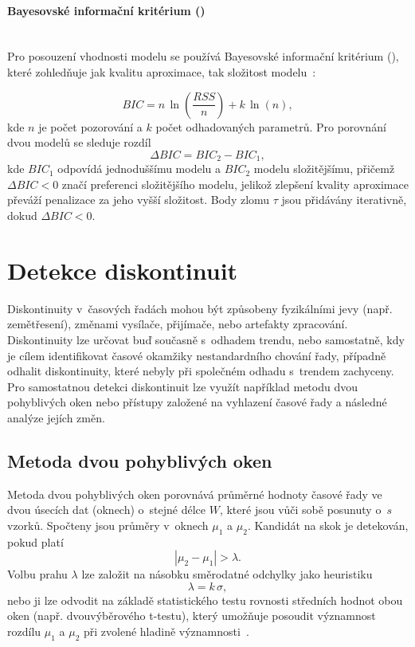 \paragraph{Bayesovské informační kritérium ()}\leavevmode\\
Pro posouzení vhodnosti modelu se používá Bayesovské informační kritérium (), které zohledňuje jak kvalitu aproximace, tak složitost modelu~\cite{kass_raftery_1995}:

\begin{equation}
BIC = n\,\ln\!\left(\frac{RSS}{n}\right) + k\,\ln(n),
\label{eq:bic}
\end{equation}
kde \(n\) je počet pozorování a \(k\) počet odhadovaných parametrů. Pro porovnání dvou modelů se sleduje rozdíl
\begin{equation}
\Delta BIC = BIC_{\mathrm{2}}-BIC_{\mathrm{1}},
\label{eq:delta_bic}
\end{equation}
kde \(BIC_1\) odpovídá jednoduššímu modelu a \(BIC_2\) modelu složitějšímu, přičemž \(\Delta BIC < 0\) značí preferenci složitějšího modelu, jelikož zlepšení kvality aproximace převáží penalizace za jeho vyšší složitost. Body zlomu \(\tau\) jsou přidávány iterativně, dokud \(\Delta BIC < 0\).

\section{Detekce diskontinuit}

Diskontinuity v~časových řadách mohou být způsobeny fyzikálními jevy (např. zemětřesení), změnami vysílače, přijímače, nebo artefakty zpracování. Diskontinuity lze určovat buď současně s~odhadem trendu, nebo samostatně, kdy je cílem identifikovat časové okamžiky nestandardního chování řady, případně odhalit diskontinuity, které nebyly při společném odhadu s~trendem zachyceny. Pro samostatnou detekci diskontinuit lze využít například metodu dvou pohyblivých oken nebo přístupy založené na vyhlazení časové řady a následné analýze jejích změn.

\subsection{Metoda dvou pohyblivých oken}

Metoda dvou pohyblivých oken porovnává průměrné hodnoty časové řady ve dvou úsecích dat (oknech) o~stejné délce \(W\), které jsou vůči sobě posunuty o~\(s\) vzorků. Spočteny jsou průměry v~oknech \(\mu_1\) a \(\mu_2\). Kandidát na skok je detekován, pokud platí
\begin{equation}
|\mu_2-\mu_1| > \lambda.
\end{equation}
Volbu prahu \(\lambda\) lze založit na násobku směrodatné odchylky jako heuristiku
\begin{equation}
\lambda = k\,\sigma,
\end{equation}
nebo ji lze odvodit na základě statistického testu rovnosti středních hodnot obou oken (např. dvouvýběrového t-testu), který umožňuje posoudit významnost rozdílu \(\mu_1\) a \(\mu_2\) při zvolené hladině významnosti~\cite{change_point_review}.


